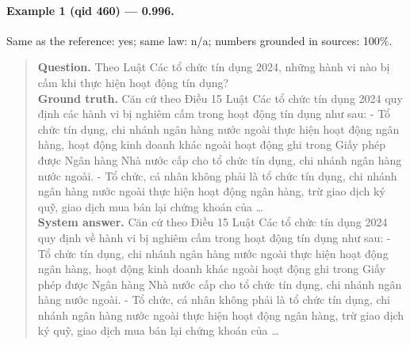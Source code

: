 \paragraph{Example 1 (qid 460) --- \rl{} 0.996.} Same \dieu{} as the reference: yes; same law: n/a; numbers grounded in sources: 100\%.
\begin{quote}\small\textbf{Question.} Theo Luật Các tổ chức tín dụng 2024, những hành vi nào bị cấm khi thực hiện hoạt động tín dụng?\\[2pt]
\textbf{Ground truth.} Căn cứ theo Điều 15 Luật Các tổ chức tín dụng 2024 quy định các hành vi bị nghiêm cấm trong hoạt động tín dụng như sau: - Tổ chức tín dụng, chi nhánh ngân hàng nước ngoài thực hiện hoạt động ngân hàng, hoạt động kinh doanh khác ngoài hoạt động ghi trong Giấy phép được Ngân hàng Nhà nước cấp cho tổ chức tín dụng, chi nhánh ngân hàng nước ngoài. - Tổ chức, cá nhân không phải là tổ chức tín dụng, chi nhánh ngân hàng nước ngoài thực hiện hoạt động ngân hàng, trừ giao dịch ký quỹ, giao dịch mua bán lại chứng khoán của …\\[2pt]
\textbf{System answer.} Căn cứ theo Điều 15 Luật Các tổ chức tín dụng 2024 quy định về hành vi bị nghiêm cấm trong hoạt động tín dụng như sau: - Tổ chức tín dụng, chi nhánh ngân hàng nước ngoài thực hiện hoạt động ngân hàng, hoạt động kinh doanh khác ngoài hoạt động ghi trong Giấy phép được Ngân hàng Nhà nước cấp cho tổ chức tín dụng, chi nhánh ngân hàng nước ngoài. - Tổ chức, cá nhân không phải là tổ chức tín dụng, chi nhánh ngân hàng nước ngoài thực hiện hoạt động ngân hàng, trừ giao dịch ký quỹ, giao dịch mua bán lại chứng khoán của …\end{quote}

